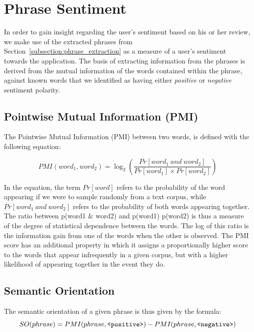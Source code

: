 \documentclass[11pt]{report} %
\begin{document}
\section{Phrase Sentiment}
\label{section:phrase_sentiment}
In order to gain insight regarding the user's sentiment based on his or her review, we make use of the extracted phrases from 
Section~\ref{subsection:phrase_extraction} as a measure of a user's sentiment towards the application. The basis of extracting information from the phrases is derived from the mutual information of the words contained within the phrase, against known words that we identified as having either \textit{positive} or \textit{negative} sentiment polarity. 

\subsection{Pointwise Mutual Information (PMI)}
The Pointwise Mutual Information (PMI) between two words\cite{church1990}, is defined with the following equation:

\begin{equation*} PMI(word_1, word_2) = \log_2 \left(\frac{Pr[word_1 \: and \: word_2]}{Pr[word_1] \times Pr[word_2]}\right) \end{equation*}

In the equation, the term $Pr[word]$ refers to the probability of the word appearing if we were to sample randomly from a text corpus, while  $Pr[word_1 \: and \: word_2]$ refers to the probability of both words appearing together. The ratio between p(word1 \& word2) and p(word1) p(word2) is thus a measure of the degree of statistical dependence between the words. The log of this ratio is the information gain from one of the words when the other is observed. The PMI score has an additional property in which it assigns a proportionally higher score to the words that appear infrequently in a given corpus, but with a higher likelihood of appearing together in the event they do\cite{Vargas2010}. 

\subsection{Semantic Orientation}
The semantic orientation of a given phrase is thus given by the formula:
\begin{equation*} SO(phrase) = PMI(phrase, \verb|<positive>|) - PMI(phrase, \verb|<negative>|)\end{equation*}
\end{document}
